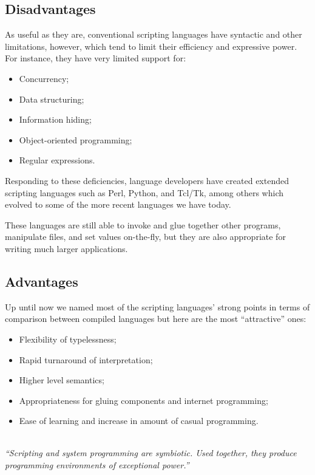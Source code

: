 \documentclass[12pt]{article}
\begin{document}
\subsection{Disadvantages}
As useful as they are, conventional scripting languages have syntactic and other limitations, however, which tend to limit their efficiency and expressive power. For instance, they have very limited support for:
\begin{itemize}

  \item Concurrency;
  \item Data structuring;
  \item Information hiding;
  \item Object-oriented programming;
  \item Regular expressions.

\end{itemize} 
Responding to these deficiencies, language developers have created extended scripting languages such as Perl, Python, and Tcl/Tk, among others which evolved to some of the more recent languages we have today.

These languages are still able to invoke and glue together other programs, manipulate files, and set values on-the-fly, but they are also appropriate for writing much larger applications.


\subsection{Advantages}

Up until now we named most of the scripting languages’ strong points in terms of comparison between compiled languages but here are the most “attractive” ones: 
\begin{itemize}
  \item Flexibility of typelessness;
  \item Rapid turnaround of interpretation;
  \item Higher level semantics;
  \item Appropriateness for gluing components and internet programming;
  \item Ease of learning and increase in amount of casual programming.
\end{itemize} 


\emph{\\“Scripting and system programming are symbiotic. Used together, they produce programming environments of exceptional power.” }
\end{document}
